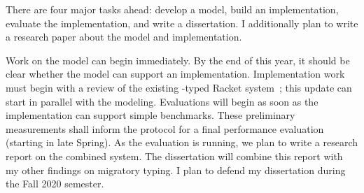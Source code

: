 There are four major tasks ahead:
  develop a model,
  build an implementation,
  evaluate the implementation,
  and write a dissertation.
I additionally plan to write a research paper about the model and
 implementation.

Work on the model can begin immediately.
By the end of this year, it should be clear whether the model can support
 an implementation.
Implementation work must begin with a review of the existing
 \tshallow{}-typed Racket system~\cite{gf-icfp-2018};
 this update can start in parallel with the modeling.
Evaluations will begin as soon as the implementation can support simple
 benchmarks.
These preliminary measurements shall inform the protocol for a final
 performance evaluation (starting in late Spring).
As the evaluation is running, we plan to write a research report on the
 combined system.
The dissertation will combine this report with my other findings on
 migratory typing.
I plan to defend my dissertation during the Fall 2020 semester.

